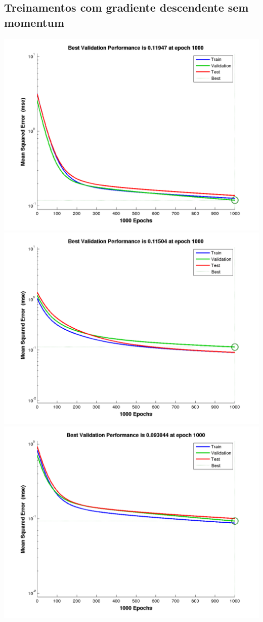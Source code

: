 \documentclass[a4paper]{article}
\begin{document}
\subsection*{Treinamentos com gradiente descendente sem momentum}
\includegraphics[width=\textwidth]{tr1.png}
\includegraphics[width=\textwidth]{tr2.png}
\includegraphics[width=\textwidth]{tr3.png}
\end{document}
